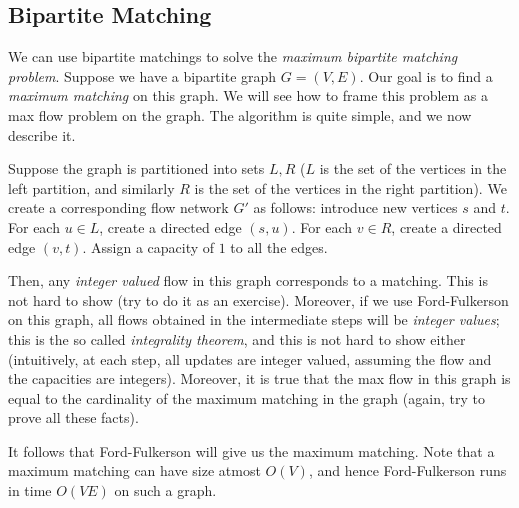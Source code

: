 \documentclass[12pt,a4paper]{amsart}
\numberwithin{equation}{section}
\theoremstyle{definition}
\begin{document}
\subsection{Bipartite Matching} We can use bipartite matchings to solve the \textit{maximum bipartite matching problem}. Suppose we have a bipartite graph $G = (V, E)$. Our goal is to find a \textit{maximum matching} on this graph. We will see how to frame this problem as a max flow problem on the graph. The algorithm is quite simple, and we now describe it.

Suppose the graph is partitioned into sets $L, R$ ($L$ is the set of the vertices in the left partition, and similarly $R$ is the set of the vertices in the right partition). We create a corresponding flow network $G'$ as follows: introduce new vertices $s$ and $t$. For each $u\in L$, create a directed edge $(s, u)$. For each $v\in R$, create a directed edge $(v, t)$. Assign a capacity of $1$ to all the edges. 

Then, any \textit{integer valued} flow in this graph corresponds to a matching. This is not  hard to show (try to do it as an exercise). Moreover, if we use Ford-Fulkerson on this graph, all flows obtained in the intermediate steps will be \textit{integer values}; this is the so called \textit{integrality theorem}, and this is not hard to show either (intuitively, at each step, all updates are integer valued, assuming the flow and the capacities are integers). Moreover, it is true that the max flow in this graph is equal to the cardinality of the maximum matching in the graph (again, try to prove all these facts).

It follows that Ford-Fulkerson will give us the maximum matching. Note that a maximum matching can have size atmost $O(V)$, and hence Ford-Fulkerson runs in time $O(VE)$ on such a graph.  
\end{document}
